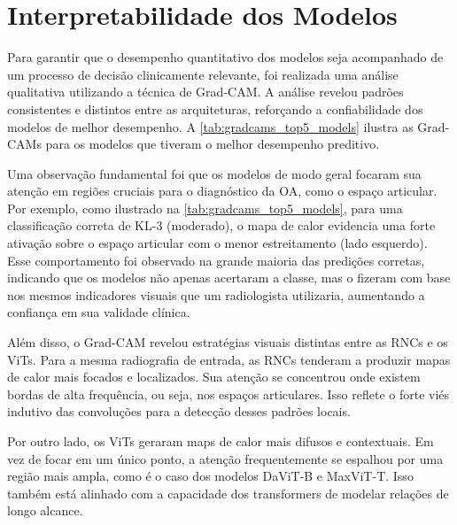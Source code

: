 \section{Interpretabilidade dos Modelos}

Para garantir que o desempenho quantitativo dos modelos seja acompanhado de um processo de decisão clinicamente relevante, foi realizada uma análise qualitativa utilizando a técnica de Grad-CAM. A análise revelou padrões consistentes e distintos entre as arquiteturas, reforçando a confiabilidade dos modelos de melhor desempenho. A \autoref{tab:gradcams_top5_models} ilustra as Grad-CAMs para os modelos que tiveram o melhor desempenho preditivo.

Uma observação fundamental foi que os modelos de modo geral focaram sua atenção em regiões cruciais para o diagnóstico da OA, como o espaço articular. Por exemplo, como ilustrado na \autoref{tab:gradcams_top5_models}, para uma classificação correta de KL-3 (moderado), o mapa de calor evidencia uma forte ativação sobre o espaço articular com o menor estreitamento (lado esquerdo). Esse comportamento foi observado na grande maioria das predições corretas, indicando que os modelos não apenas acertaram a classe, mas o fizeram com base nos mesmos indicadores visuais que um radiologista utilizaria, aumentando a confiança em sua validade clínica.

Além disso, o Grad-CAM revelou estratégias visuais distintas entre as RNCs e os ViTs. Para a mesma radiografia de entrada, as RNCs tenderam a produzir mapas de calor mais focados e localizados. Sua atenção se concentrou onde existem bordas de alta frequência, ou seja, nos espaços articulares. Isso reflete o forte viés indutivo das convoluções para a detecção desses padrões locais.

Por outro lado, os ViTs geraram maps de calor mais difusos e contextuais. Em vez de focar em um único ponto, a atenção frequentemente se espalhou por uma região mais ampla, como é o caso dos modelos DaViT-B e MaxViT-T. Isso também está alinhado com a capacidade dos transformers de modelar relações de longo alcance.

